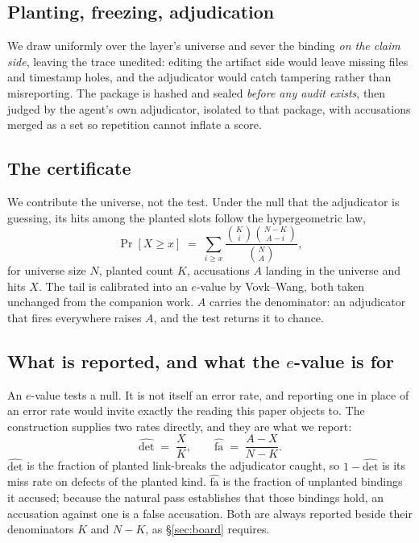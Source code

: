 \documentclass[10pt]{article}
\begin{document}
\subsection{Planting, freezing, adjudication}
We draw uniformly over the layer's universe and sever the binding \emph{on the
claim side}, leaving the trace unedited: editing the artifact side would leave
missing files and timestamp holes, and the adjudicator would catch tampering
rather than misreporting. The package is hashed and sealed \emph{before any
audit exists}, then judged by the agent's own adjudicator, isolated to that
package, with accusations merged as a set so repetition cannot inflate a score.

\subsection{The certificate}
We contribute the universe, not the test. Under the null that the adjudicator
is guessing, its hits among the planted slots follow the hypergeometric law,
\[
  \Pr[X \geq x] \;=\;
  \sum_{i \geq x} \frac{\binom{K}{i}\binom{N-K}{A-i}}{\binom{N}{A}},
\]
for universe size $N$, planted count $K$, accusations $A$ landing in the
universe and hits $X$. The tail is calibrated into an $e$-value by Vovk--Wang,
both taken unchanged from the companion work. $A$ carries the denominator: an
adjudicator that fires everywhere raises $A$, and the test returns it to chance.

\subsection{What is reported, and what the \texorpdfstring{$e$}{e}-value is for}
\label{sec:rates}

An $e$-value tests a null. It is not itself an error rate, and reporting one in
place of an error rate would invite exactly the reading this paper objects to.
The construction supplies two rates directly, and they are what we report:
\[
  \widehat{\mathrm{det}} \;=\; \frac{X}{K},
  \qquad
  \widehat{\mathrm{fa}} \;=\; \frac{A-X}{N-K}.
\]
$\widehat{\mathrm{det}}$ is the fraction of planted link-breaks the adjudicator
caught, so $1-\widehat{\mathrm{det}}$ is its miss rate on defects of the planted
kind. $\widehat{\mathrm{fa}}$ is the fraction of unplanted bindings it accused;
because the natural pass establishes that those bindings hold, an accusation
against one is a false accusation. Both are always reported beside their
denominators $K$ and $N-K$, as \S\ref{sec:board} requires.
\end{document}

